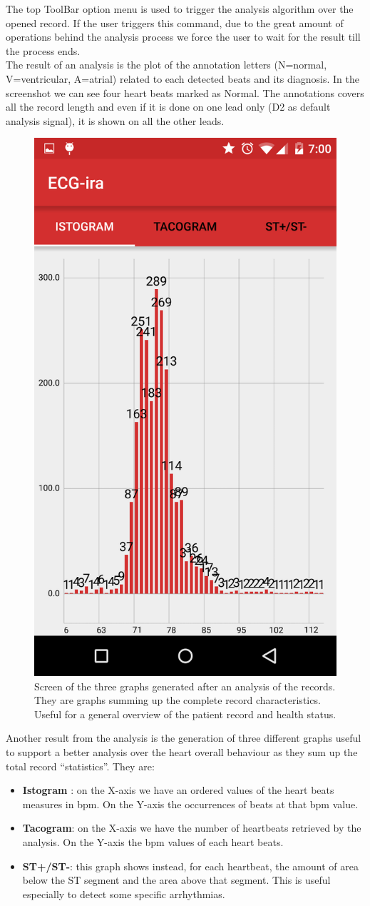 The top ToolBar option menu is used to trigger the analysis algorithm over the opened record. If the user triggers this command, due to the great amount of operations behind the analysis process we force the user to wait for the result till the process ends. \\
The result of an analysis is the plot of the annotation letters (N=normal, V=ventricular, A=atrial) related to each detected beats and its diagnosis.  In the screenshot we can see four heart beats marked as Normal. The annotations covers all the record length and even if it is done on one lead only (D2 as default analysis signal), it is shown on all the other leads.
\newpage
\begin{figure}
\centering
\includegraphics[width=0.3\linewidth]{figures/ch10/9.png}
	\caption{Screen of the three graphs generated after an analysis of the records. They are graphs summing up the complete record characteristics. Useful for a general overview of the patient record and health status.}  
	\label{fig10.9}
\end{figure}
Another result from the analysis is the generation of three different graphs useful to support a better analysis over the heart overall behaviour as they sum up the total record “statistics”. They are:\\
\begin{itemize}
\item \textbf{Istogram} : on the X-axis we have an ordered values of the heart beats measures in bpm. On the Y-axis the occurrences of beats at that bpm value.
\item \textbf{Tacogram}: on the X-axis we have the number of heartbeats retrieved by the analysis. On the Y-axis the bpm values of each heart beats. 
\item \textbf{ST+/ST-}: this graph shows instead, for each heartbeat, the amount of area below the ST segment and the area above that segment. This is useful especially to detect some specific arrhythmias.
\end{itemize}
